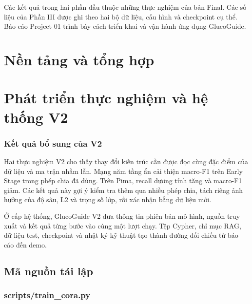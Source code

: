Các kết quả trong hai phần đầu thuộc những thực nghiệm của bản Final. Các số liệu của Phần III được ghi theo hai bộ dữ liệu, cấu hình và checkpoint cụ thể. Báo cáo Project 01 trình bày cách triển khai và vận hành ứng dụng GlucoGuide.


\part{Nền tảng và tổng hợp}


\part{Phát triển thực nghiệm và hệ thống V2}


\section*{Kết quả bổ sung của V2}
Hai thực nghiệm V2 cho thấy thay đổi kiến trúc cần được đọc cùng đặc điểm của dữ liệu và ma trận nhầm lẫn. Mạng năm tầng ẩn cải thiện macro-F1 trên Early Stage trong phép chia đã dùng. Trên Pima, recall dương tính tăng và macro-F1 giảm. Các kết quả này gợi ý kiểm tra thêm qua nhiều phép chia, tách riêng ảnh hưởng của độ sâu, L2 và trọng số lớp, rồi xác nhận bằng dữ liệu mới.

Ở cấp hệ thống, GlucoGuide V2 đưa thông tin phiên bản mô hình, nguồn truy xuất và kết quả từng bước vào cùng một lượt chạy. Tệp Cypher, chỉ mục RAG, dữ liệu test, checkpoint và nhật ký kỹ thuật tạo thành đường đối chiếu từ báo cáo đến demo.

\appendix
\chapter{Mã nguồn tái lập}
\section{scripts/train\_cora.py}



